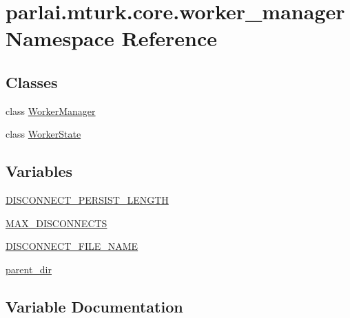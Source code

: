 \hypertarget{namespaceparlai_1_1mturk_1_1core_1_1worker__manager}{}\section{parlai.\+mturk.\+core.\+worker\+\_\+manager Namespace Reference}
\label{namespaceparlai_1_1mturk_1_1core_1_1worker__manager}
\subsection*{Classes}
\begin{DoxyCompactItemize}
\item 
class \hyperlink{classparlai_1_1mturk_1_1core_1_1worker__manager_1_1WorkerManager}{Worker\+Manager}
\item 
class \hyperlink{classparlai_1_1mturk_1_1core_1_1worker__manager_1_1WorkerState}{Worker\+State}
\end{DoxyCompactItemize}
\subsection*{Variables}
\begin{DoxyCompactItemize}
\item 
\hyperlink{namespaceparlai_1_1mturk_1_1core_1_1worker__manager_a957b3dfeba8aec044c277030ecb6d771}{D\+I\+S\+C\+O\+N\+N\+E\+C\+T\+\_\+\+P\+E\+R\+S\+I\+S\+T\+\_\+\+L\+E\+N\+G\+TH}
\item 
\hyperlink{namespaceparlai_1_1mturk_1_1core_1_1worker__manager_ac1bd5331849830ed8dcc3065d8dd310a}{M\+A\+X\+\_\+\+D\+I\+S\+C\+O\+N\+N\+E\+C\+TS}
\item 
\hyperlink{namespaceparlai_1_1mturk_1_1core_1_1worker__manager_a658ea6ef41cd12b562e80fb98cb389b9}{D\+I\+S\+C\+O\+N\+N\+E\+C\+T\+\_\+\+F\+I\+L\+E\+\_\+\+N\+A\+ME}
\item 
\hyperlink{namespaceparlai_1_1mturk_1_1core_1_1worker__manager_ad55d781239dedaf5a8409f99a5b181ed}{parent\+\_\+dir}
\end{DoxyCompactItemize}


\subsection{Variable Documentation}
\mbox{\label{namespaceparlai_1_1mturk_1_1core_1_1worker__manager_a658ea6ef41cd12b562e80fb98cb389b9}} 
